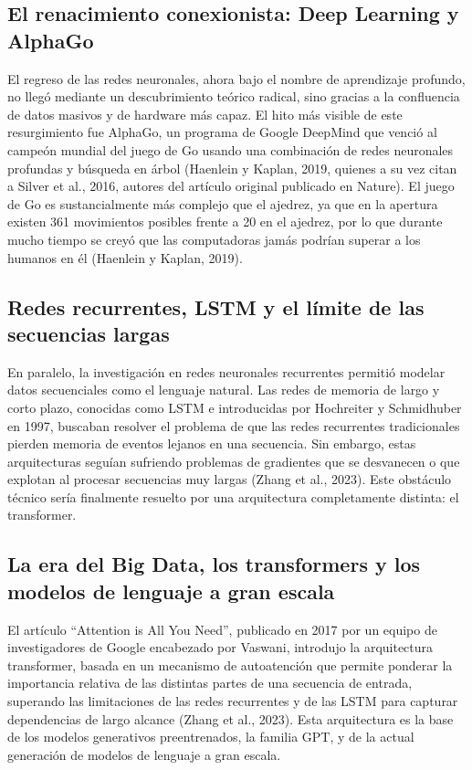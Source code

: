 \documentclass[12pt,letterpaper]{article}
\begin{document}
\subsection{El renacimiento conexionista: Deep Learning y AlphaGo}

El regreso de las redes neuronales, ahora bajo el nombre de aprendizaje profundo, no lleg\'o mediante un descubrimiento te\'orico radical, sino gracias a la confluencia de datos masivos y de hardware m\'as capaz. El hito m\'as visible de este resurgimiento fue AlphaGo, un programa de Google DeepMind que venci\'o al campe\'on mundial del juego de Go usando una combinaci\'on de redes neuronales profundas y b\'usqueda en \'arbol (Haenlein y Kaplan, 2019, quienes a su vez citan a Silver et al., 2016, autores del art\'iculo original publicado en Nature). El juego de Go es sustancialmente m\'as complejo que el ajedrez, ya que en la apertura existen 361 movimientos posibles frente a 20 en el ajedrez, por lo que durante mucho tiempo se crey\'o que las computadoras jam\'as podr\'ian superar a los humanos en \'el (Haenlein y Kaplan, 2019).

\subsection{Redes recurrentes, LSTM y el l\'imite de las secuencias largas}

En paralelo, la investigaci\'on en redes neuronales recurrentes permiti\'o modelar datos secuenciales como el lenguaje natural. Las redes de memoria de largo y corto plazo, conocidas como LSTM e introducidas por Hochreiter y Schmidhuber en 1997, buscaban resolver el problema de que las redes recurrentes tradicionales pierden memoria de eventos lejanos en una secuencia. Sin embargo, estas arquitecturas segu\'ian sufriendo problemas de gradientes que se desvanecen o que explotan al procesar secuencias muy largas (Zhang et al., 2023). Este obst\'aculo t\'ecnico ser\'ia finalmente resuelto por una arquitectura completamente distinta: el transformer.

\subsection{La era del Big Data, los transformers y los modelos de lenguaje a gran escala}

El art\'iculo ``Attention is All You Need'', publicado en 2017 por un equipo de investigadores de Google encabezado por Vaswani, introdujo la arquitectura transformer, basada en un mecanismo de autoatenci\'on que permite ponderar la importancia relativa de las distintas partes de una secuencia de entrada, superando las limitaciones de las redes recurrentes y de las LSTM para capturar dependencias de largo alcance (Zhang et al., 2023). Esta arquitectura es la base de los modelos generativos preentrenados, la familia GPT, y de la actual generaci\'on de modelos de lenguaje a gran escala.
\end{document}
